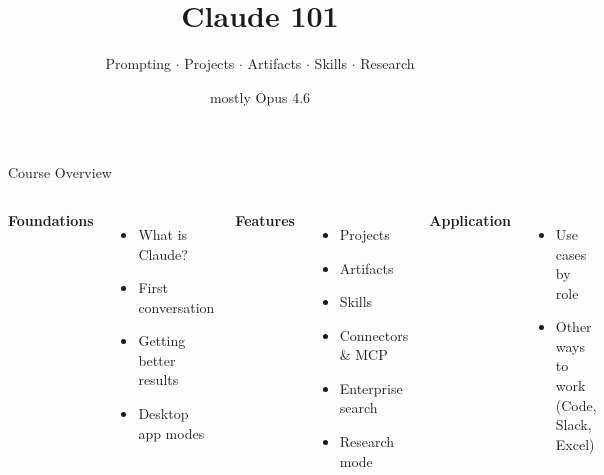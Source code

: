 \documentclass[aspectratio=169]{beamer}
\title{Claude 101}
\subtitle{Prompting $\cdot$ Projects $\cdot$ Artifacts $\cdot$ Skills $\cdot$ Research}
\author{mostly Opus 4.6}
\date{}
\begin{document}
\begin{frame}
\titlepage
\end{frame}

\begin{frame}{Course Overview}
\begin{columns}[T]
\textbf{\color{popblue}Foundations}
\begin{itemize}
  \item What is Claude?
  \item First conversation
  \item Getting better results
  \item Desktop app modes
\end{itemize}

\textbf{\color{paramgreen}Features}
\begin{itemize}
  \item Projects
  \item Artifacts
  \item Skills
  \item Connectors \& MCP
  \item Enterprise search
  \item Research mode
\end{itemize}

\textbf{\color{violet1}Application}
\begin{itemize}
  \item Use cases by role
  \item Other ways to work\\(Code, Slack, Excel)
\end{itemize}
\end{columns}
\end{frame}
\end{document}
